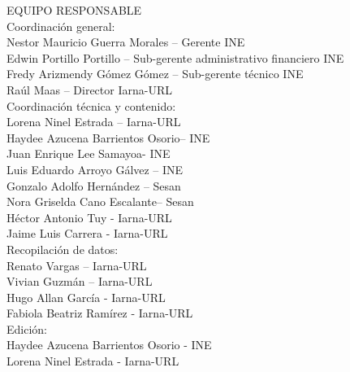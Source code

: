 \begin{center}
	{\Bold \LARGE EQUIPO RESPONSABLE}\\[2cm]
	
	{\Bold \large \color{color1!89!black} Coordinación general:}\\[0.2cm]
Nestor Mauricio Guerra Morales – Gerente INE \\
Edwin Portillo Portillo – Sub-gerente administrativo financiero INE \\
Fredy Arizmendy Gómez Gómez – Sub-gerente técnico INE \\
Raúl Maas – Director Iarna-URL\\[0.8cm]

{\Bold \large \color{color1!89!black} Coordinación técnica y contenido:}\\[0.2cm]
Lorena Ninel Estrada – Iarna-URL\\
Haydee Azucena Barrientos Osorio– INE\\
Juan Enrique Lee Samayoa- INE\\
Luis Eduardo Arroyo Gálvez – INE\\
Gonzalo Adolfo Hernández – Sesan\\
Nora Griselda Cano Escalante– Sesan\\
Héctor Antonio Tuy - Iarna-URL\\
Jaime Luis Carrera - Iarna-URL\\[0.8cm]
{\Bold \large \color{color1!89!black} Recopilación de datos:}\\[0.2cm]

Renato Vargas – Iarna-URL\\
Vivian Guzmán – Iarna-URL \\
Hugo Allan García - Iarna-URL \\
Fabiola Beatriz Ramírez - Iarna-URL \\[0.8cm]

	{\Bold \large \color{color1!89!black} Edición:}\\[0.2cm]
Haydee Azucena Barrientos Osorio - INE\\
Lorena Ninel Estrada - Iarna-URL \\[0.8cm]


		
\end{center}\cleardoublepage

